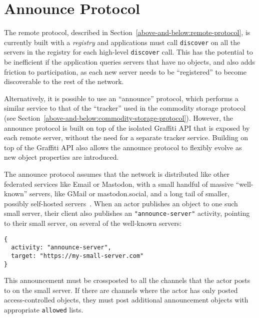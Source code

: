 

\section{Announce Protocol}

\label{above-and-below:announce-protocol}

The remote protocol, described in Section~\ref{above-and-below:remote-protocol},
is currently built with a \emph{registry} and applications must
call \texttt{discover} on all the servers in the registry for
each high-level \texttt{discover} call.
This has the potential to be inefficient if the application queries
servers that have no objects, and also adds friction to participation,
as each new server needs to be ``registered'' to become discoverable
to the rest of the network.

Alternatively, it is possible to use an ``announce'' protocol,
which performs a similar service to that of the ``tracker'' used in
the commodity storage protocol (see Section~\ref{above-and-below:commodity-storage-protocol}). However, the announce protocol is built on top of the isolated Graffiti
API that is exposed by each remote server, without the need for a separate
tracker service. Building on top of the Graffiti API also 
allows the announce protocol to flexibly evolve as
new object properties are introduced.

The announce protocol assumes that the network is distributed like other
federated services like Email or Mastodon, with a small handful of
massive ``well-known'' servers, like GMail or mastodon.social, and a long
tail of smaller, possibly self-hosted servers~\cite{mastodonchallenges}.
When an actor publishes an object to one such small server,
their client also publishes an \texttt{"announce-server"}
activity, pointing to their small server, on several of the well-known
servers:
\begin{verbatim}
{
  activity: "announce-server",
  target: "https://my-small-server.com"
}
\end{verbatim}
This announcement must be crossposted to all the channels
that the actor posts to on the small server.
If there are channels where the actor has only posted
access-controlled objects, they must post additional announcement
objects with appropriate \texttt{allowed} lists.

